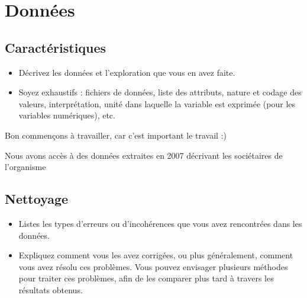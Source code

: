 \documentclass{ceri/sty/rapport}
\begin{document}
\section{Données}

\subsection{Caractéristiques}
\begin{itemize}
	\item Décrivez les données et l'exploration que vous en avez faite.
	\item Soyez exhaustifs : fichiers de données, liste des attributs, nature et codage des valeurs, interprétation, unité dans laquelle la variable est exprimée (pour les variables numériques), etc.
\end{itemize}

Bon commençons à travailler, car c'est important le travail :)

Nous avons accès à des données extraites en 2007 décrivant les sociétaires de l'organisme





\subsection{Nettoyage}
\label{sec:Nettoyage}
\begin{itemize}
	\item Listes les types d'erreurs ou d'incohérences que vous avez rencontrées dans les données.
	\item Expliquez comment vous les avez corrigées, ou plus généralement, comment vous avez résolu ces problèmes. Vous pouvez envisager plusieurs méthodes pour traiter ces problèmes, afin de les comparer plus tard à travers les résultats obtenus.
\end{itemize}




\end{document}
